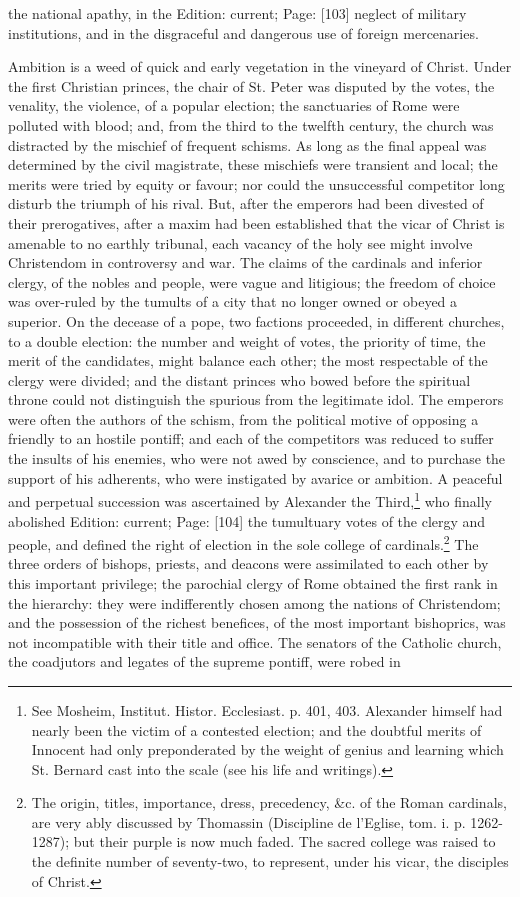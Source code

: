the national apathy, in the Edition: current; Page: [103] neglect of military institutions, and in the disgraceful and dangerous use of foreign mercenaries.

Ambition is a weed of quick and early vegetation in the vineyard of Christ. Under the first Christian princes, the chair of St. Peter was disputed by the votes, the venality, the violence, of a popular election; the sanctuaries of Rome were polluted with blood; and, from the third to the twelfth century, the church was distracted by the mischief of frequent schisms. As long as the final appeal was determined by the civil magistrate, these mischiefs were transient and local; the merits were tried by equity or favour; nor could the unsuccessful competitor long disturb the triumph of his rival. But, after the emperors had been divested of their prerogatives, after a maxim had been established that the vicar of Christ is amenable to no earthly tribunal, each vacancy of the holy see might involve Christendom in controversy and war. The claims of the cardinals and inferior clergy, of the nobles and people, were vague and litigious; the freedom of choice was over-ruled by the tumults of a city that no longer owned or obeyed a superior. On the decease of a pope, two factions proceeded, in different churches, to a double election: the number and weight of votes, the priority of time, the merit of the candidates, might balance each other; the most respectable of the clergy were divided; and the distant princes who bowed before the spiritual throne could not distinguish the spurious from the legitimate idol. The emperors were often the authors of the schism, from the political motive of opposing a friendly to an hostile pontiff; and each of the competitors was reduced to suffer the insults of his enemies, who were not awed by conscience, and to purchase the support of his adherents, who were instigated by avarice or ambition. A peaceful and perpetual succession was ascertained by Alexander the Third,\footnote{See Mosheim, Institut. Histor. Ecclesiast. p. 401, 403. Alexander himself had nearly been the victim of a contested election; and the doubtful merits of Innocent had only preponderated by the weight of genius and learning which St. Bernard cast into the scale (see his life and writings).} who finally abolished Edition: current; Page: [104] the tumultuary votes of the clergy and people, and defined the right of election in the sole college of cardinals.\footnote{The origin, titles, importance, dress, precedency, \&c. of the Roman cardinals, are very ably discussed by Thomassin (Discipline de l\texthebrew{}’Eglise, tom. i. p. 1262-1287); but their purple is now much faded. The sacred college was raised to the definite number of seventy-two, to represent, under his vicar, the disciples of Christ.} The three orders of bishops, priests, and deacons were assimilated to each other by this important privilege; the parochial clergy of Rome obtained the first rank in the hierarchy: they were indifferently chosen among the nations of Christendom; and the possession of the richest benefices, of the most important bishoprics, was not incompatible with their title and office. The senators of the Catholic church, the coadjutors and legates of the supreme pontiff, were robed in 